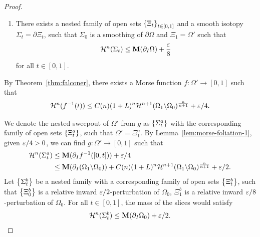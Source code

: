 \begin{lemma}
\begin{proof}
\begin{enumerate}
            \item[(b)] There exists a nested family of open sets $\left\{\Xi_t\right\}_{t \in [0, 1]}$ and a smooth isotopy $\Sigma_t = \partial\Xi_t$, such that $\Sigma_0$ is a smoothing of $\partial\Omega$ and $\Xi_1 = \Omega'$ such that
            \begin{equation*}
                \mathcal{H}^n(\Sigma_t) \leq \mathbf{M}(\partial_I\Omega) + \frac{\varepsilon}{8}
            \end{equation*}
            for all $t \in [0, 1]$.
        \end{enumerate}
        By Theorem~\ref{thm:falconer}, there exists a Morse function $f: \Omega' \to [0, 1]$ such that
        \begin{equation*}
        \begin{split}
            \mathcal{H}^n(f^{-1}(t)) \leq C(n)(1 + L)^n\mathcal{H}^{n+1}(\Omega_1\backslash\Omega_0)^{\frac{n}{n + 1}} + \varepsilon/4.
        \end{split}
        \end{equation*}

        We denote the nested sweepout of $\Omega'$ from $g$ as $\left\{\Sigma_t^a\right\}$ with the corresponding family of open sets $\left\{\Xi_t^a\right\}$, such that $\Omega' = \Xi_1^a$. By Lemma~\ref{lem:morse-foliation-1}, given $\varepsilon/4 > 0$, we can find $g: \Omega' \to [0, 1]$ such that
        \begin{equation}\label{eq:sigma-a-t}
            \begin{split}
                \mathcal{H}^n(\Sigma_t^a) &\leq \mathbf{M}(\partial_I f^{-1}([0, t])) + \varepsilon/4\\
                &\leq \mathbf{M}(\partial_I(\Omega_1\backslash\Omega_0)) + C(n)(1 + L)^n\mathcal{H}^{n+1}(\Omega_1\backslash\Omega_0)^{\frac{n}{n + 1}} + \varepsilon/2.
            \end{split}
        \end{equation}
        Let $\left\{\Sigma_t^b\right\}$ be a nested family with a corresponding family of open sets $\left\{\Xi_t^b\right\}$, such that $\left\{\Xi_0^b\right\}$ is a relative inward $\varepsilon/2$-perturbation of $\Omega_0$, $\Xi_1^b$ is a relative inward $\varepsilon/8$-perturbation of $\Omega_0$. For all $t \in [0, 1]$, the mass of the slices would satisfy
        \begin{equation}\label{eq:sigma-b-t}
            \mathcal{H}^n(\Sigma_t^b) \leq \mathbf{M}(\partial_I\Omega_0) + \varepsilon/2.
        \end{equation}


\end{proof}
\end{lemma}
